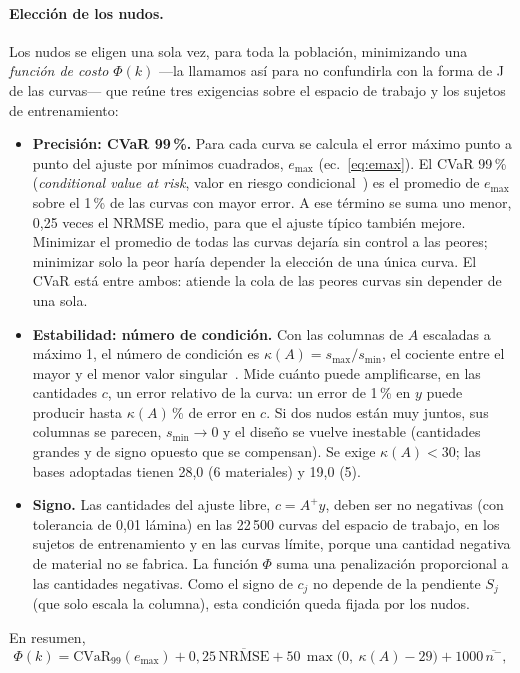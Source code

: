 \paragraph{Elección de los nudos.} Los nudos se eligen una sola vez, para toda la población, minimizando una \emph{función de costo} $\Phi(k)$ ---la llamamos así para no confundirla con la forma de J de las curvas--- que reúne tres exigencias sobre el espacio de trabajo y los sujetos de entrenamiento:
\begin{itemize}
\item \textbf{Precisión: CVaR 99\,\%.} Para cada curva se calcula el error máximo punto a punto del ajuste por mínimos cuadrados, $e_{\max}$ (ec.~\ref{eq:emax}). El CVaR 99\,\% (\emph{conditional value at risk}, valor en riesgo condicional~\cite{rockafellar}) es el promedio de $e_{\max}$ sobre el 1\,\% de las curvas con mayor error. A ese término se suma uno menor, 0,25 veces el NRMSE medio, para que el ajuste típico también mejore. Minimizar el promedio de todas las curvas dejaría sin control a las peores; minimizar solo la peor haría depender la elección de una única curva. El CVaR está entre ambos: atiende la cola de las peores curvas sin depender de una sola.
\item \textbf{Estabilidad: número de condición.} Con las columnas de $A$ escaladas a máximo 1, el número de condición es $\kappa(A)=s_{\max}/s_{\min}$, el cociente entre el mayor y el menor valor singular~\cite{trefethen}. Mide cuánto puede amplificarse, en las cantidades $c$, un error relativo de la curva: un error de 1\,\% en $y$ puede producir hasta $\kappa(A)$\,\% de error en $c$. Si dos nudos están muy juntos, sus columnas se parecen, $s_{\min}\to0$ y el diseño se vuelve inestable (cantidades grandes y de signo opuesto que se compensan). Se exige $\kappa(A)<30$; las bases adoptadas tienen 28,0 (6 materiales) y 19,0 (5).
\item \textbf{Signo.} Las cantidades del ajuste libre, $c=A^+y$, deben ser no negativas (con tolerancia de 0,01 lámina) en las 22\,500 curvas del espacio de trabajo, en los sujetos de entrenamiento y en las curvas límite, porque una cantidad negativa de material no se fabrica. La función $\Phi$ suma una penalización proporcional a las cantidades negativas. Como el signo de $c_j$ no depende de la pendiente $S_j$ (que solo escala la columna), esta condición queda fijada por los nudos.
\end{itemize}
En resumen,
\begin{equation}\label{eq:costo}
\Phi(k)=\mathrm{CVaR}_{99}(e_{\max})+0{,}25\,\overline{\mathrm{NRMSE}}+50\,\max\bigl(0,\ \kappa(A)-29\bigr)+1000\,\overline{n^{-}},
\end{equation}
